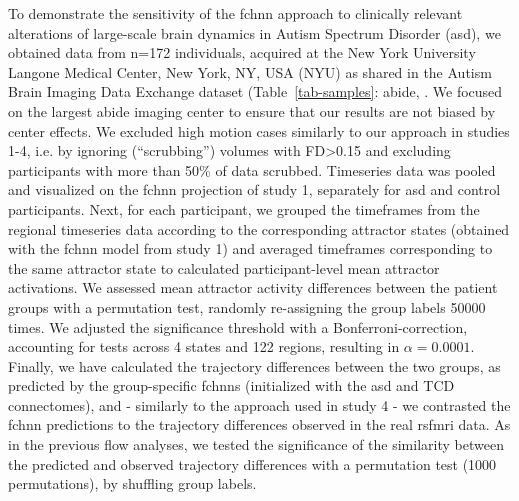 \documentclass{article}
\begin{document}
To demonstrate the sensitivity of the \acrshort{fchnn} approach to clinically relevant alterations of large-scale brain dynamics in Autism Spectrum Disorder (\acrshort{asd}), we obtained data from n=172 individuals, acquired at the New York University Langone Medical Center, New York, NY, USA (NYU) as shared in the Autism Brain Imaging Data Exchange dataset (Table~\ref{tab-samples}: \acrshort{abide}, \citep{di2014autism}. We focused on the largest \acrshort{abide} imaging center to ensure that our results are not biased by center effects. We excluded high motion cases similarly to our approach in studies 1-4, i.e. by ignoring (``scrubbing'') volumes with FD\textgreater 0.15 and excluding participants with more than 50\% of data scrubbed. Timeseries data was pooled and visualized on the \acrshort{fchnn} projection of study 1, separately for \acrshort{asd} and control participants.
Next, for each participant, we grouped the timeframes from the regional timeseries data according to the corresponding attractor states (obtained with the \acrshort{fchnn} model from study 1) and averaged timeframes corresponding to the same attractor state to calculated participant-level mean attractor activations.
We assessed mean attractor activity differences between the patient groups with a permutation test, randomly re-assigning the group labels 50000 times.
We adjusted the significance threshold with a Bonferroni-correction, accounting for tests across 4 states and 122 regions, resulting in $\alpha = 0.0001$.
Finally, we have calculated the trajectory differences between the two groups, as predicted by the group-specific \acrshort{fchnn}s (initialized with the \acrshort{asd} and TCD connectomes), and - similarly to the approach used in study 4 - we contrasted the \acrshort{fchnn} predictions to the trajectory differences observed in the real rs\acrshort{fmri} data. As in the previous flow analyses, we tested the significance of the similarity between the predicted and observed trajectory differences with a permutation test (1000 permutations), by shuffling group labels.
\printglossaries






\end{document}
